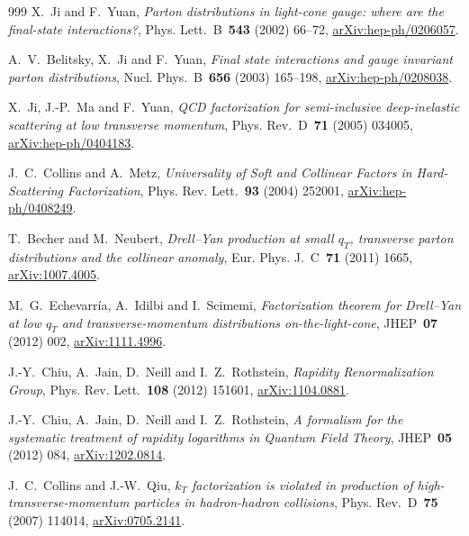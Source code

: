 \begin{thebibliography}{999}
X.~Ji and F.~Yuan, \emph{Parton distributions in light-cone gauge: where are the final-state interactions?}, Phys. Lett.~B~\textbf{543} (2002) \mbox{66--72}, \href{https://arxiv.org/abs/hep-ph/0206057}{arXiv:hep-ph/0206057}.

A.~V.~Belitsky, X.~Ji and F.~Yuan, \emph{Final state interactions and gauge invariant parton distributions}, Nucl. Phys.~B~\textbf{656} (2003) \mbox{165--198}, \href{https://arxiv.org/abs/hep-ph/0208038}{arXiv:hep-ph/0208038}.

X.~Ji, J.-P.~Ma and F.~Yuan, \emph{QCD factorization for semi-inclusive deep-inelastic scattering at low transverse momentum}, Phys. Rev.~D~\textbf{71} (2005) \mbox{034005}, \href{https://arxiv.org/abs/hep-ph/0404183}{arXiv:hep-ph/0404183}.

J.~C.~Collins and A.~Metz, \emph{Universality of Soft and Collinear Factors in Hard-Scattering Factorization}, Phys. Rev. Lett.~\textbf{93} (2004) \mbox{252001}, \href{https://arxiv.org/abs/hep-ph/0408249}{arXiv:hep-ph/0408249}.

T.~Becher and M.~Neubert, \emph{Drell--Yan production at small $q_T$, transverse parton distributions and the collinear anomaly}, Eur. Phys. J.~C~\textbf{71} (2011) \mbox{1665}, \href{https://arxiv.org/abs/1007.4005}{arXiv:1007.4005}.

M.~G.~Echevarría, A.~Idilbi and I.~Scimemi, \emph{Factorization theorem for Drell--Yan at low $q_T$ and transverse-momentum distributions on-the-light-cone}, JHEP~\textbf{07} (2012) \mbox{002}, \href{https://arxiv.org/abs/1111.4996}{arXiv:1111.4996}.

J.-Y.~Chiu, A.~Jain, D.~Neill and I.~Z.~Rothstein, \emph{Rapidity Renormalization Group}, Phys. Rev. Lett.~\textbf{108} (2012) \mbox{151601}, \href{https://arxiv.org/abs/1104.0881}{arXiv:1104.0881}.

J.-Y.~Chiu, A.~Jain, D.~Neill and I.~Z.~Rothstein, \emph{A formalism for the systematic treatment of rapidity logarithms in Quantum Field Theory}, JHEP~\textbf{05} (2012) \mbox{084}, \href{https://arxiv.org/abs/1202.0814}{arXiv:1202.0814}.

J.~C.~Collins and J.-W.~Qiu, \emph{$k_T$ factorization is violated in production of high-transverse-momentum particles in hadron-hadron collisions}, Phys. Rev.~D~\textbf{75} (2007) \mbox{114014}, \href{https://arxiv.org/abs/0705.2141}{arXiv:0705.2141}.


\end{thebibliography}
